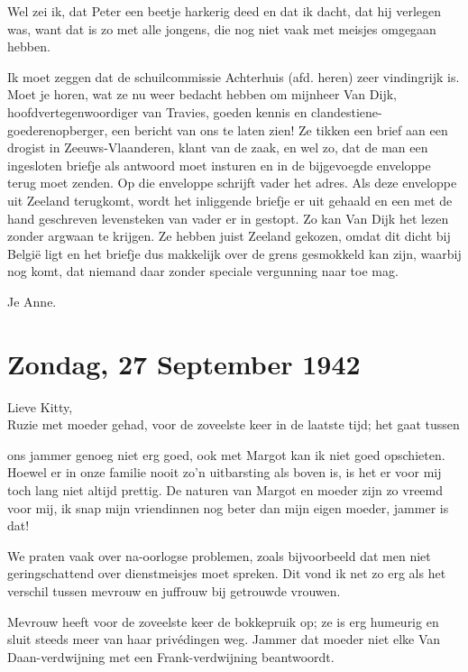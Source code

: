 \documentclass{book}
\begin{document}
Wel zei ik, dat Peter een beetje harkerig deed en dat ik dacht, dat hij
verlegen was, want dat is zo met alle jongens, die nog niet vaak met
meisjes omgegaan hebben.

Ik moet zeggen dat de schuilcommissie Achterhuis (afd. heren) zeer
vindingrijk is. Moet je horen, wat ze nu weer bedacht hebben om mijnheer
Van Dijk, hoofdvertegenwoordiger van Travies, goeden kennis en
clandestiene-goederenopberger, een bericht van ons te laten zien! Ze
tikken een brief aan een drogist in Zeeuws-Vlaanderen, klant van de
zaak, en wel zo, dat de man een ingesloten briefje als antwoord moet
insturen en in de bijgevoegde enveloppe terug moet zenden. Op die
enveloppe schrijft vader het adres. Als deze enveloppe uit Zeeland
terugkomt, wordt het inliggende briefje er uit gehaald en een met de
hand geschreven levensteken van vader er in gestopt. Zo kan Van Dijk het
lezen zonder argwaan te krijgen. Ze hebben juist Zeeland gekozen, omdat
dit dicht bij België ligt en het briefje dus makkelijk over de grens
gesmokkeld kan zijn, waarbij nog komt, dat niemand daar zonder speciale
vergunning naar toe mag.

Je Anne.

\chapter{Zondag, 27 September 1942}

Lieve Kitty,\\Ruzie met moeder gehad, voor de zoveelste keer in de
laatste tijd; het gaat tussen

ons jammer genoeg niet erg goed, ook met Margot kan ik niet goed
opschieten. Hoewel er in onze familie nooit zo'n uitbarsting als boven
is, is het er voor mij toch lang niet altijd prettig. De naturen van
Margot en moeder zijn zo vreemd voor mij, ik snap mijn vriendinnen nog
beter dan mijn eigen moeder, jammer is dat!

We praten vaak over na-oorlogse problemen, zoals bijvoorbeeld dat men
niet geringschattend over dienstmeisjes moet spreken. Dit vond ik net zo
erg als het verschil tussen mevrouw en juffrouw bij getrouwde vrouwen.

Mevrouw heeft voor de zoveelste keer de bokkepruik op; ze is erg
humeurig en sluit steeds meer van haar privédingen weg. Jammer dat
moeder niet elke Van Daan-verdwijning met een Frank-verdwijning
beantwoordt.
\end{document}

